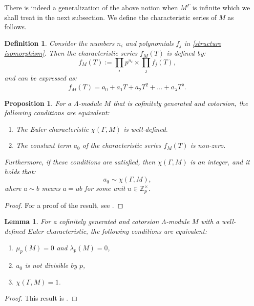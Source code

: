 \documentclass[12pt]{amsart}
\newtheorem{lemma}[theorem]{Lemma}
\newtheorem{definition}[theorem]{Definition}
\newtheorem{proposition}[theorem]{Proposition}
\newcommand{\Z}{\mathbb{Z}}
\numberwithin{equation}{section}
\begin{document}
There is indeed a generalization of the above notion when $M^\Gamma$ is infinite which we shall treat in the next subsection.
We define the characteristic series of $ M $ as follows.

\begin{definition}
Consider the numbers $n_i$ and polynomials $f_j$ in \eqref{structure isomorphism}. Then the characteristic series $ f_M(T) $ is defined by:
    \[
    f_M(T) := \prod_i p^{n_i} \times \prod_j f_j(T),
    \]
    and can be expressed as:
    \[
    f_M(T) = a_0 + a_1 T + a_2 T^2 + \dots + a_\lambda T^\lambda.
    \]
\end{definition}

\begin{proposition}\label{Prop 3.6}
    For a $\Lambda$-module $ M $ that is cofinitely generated and cotorsion, the following conditions are equivalent:
    \begin{enumerate}
        \item The Euler characteristic $\chi(\Gamma, M)$ is well-defined.
        \item The constant term $ a_0 $ of the characteristic series $ f_M(T) $ is non-zero.
    \end{enumerate}
    Furthermore, if these conditions are satisfied, then $\chi(\Gamma, M)$ is an integer, and it holds that:
    \[
    a_0 \sim \chi(\Gamma, M),
    \]
    where $ a \sim b $ means $ a = ub $ for some unit $ u \in \Z_p^\times $.
\end{proposition}

\begin{proof}
   For a proof of the result, see \cite[Proposition 4.4]{ray2024analogue}.
\end{proof}

\begin{lemma}\label{lem:classical-euler-characteristic}
    For a cofinitely generated and cotorsion $\Lambda$-module $ M $ with a well-defined Euler characteristic, the following conditions are equivalent:
    \begin{enumerate}
        \item\label{p1} $\mu_p(M) = 0$ and $\lambda_p(M) = 0$,
        \item\label{p2} $ a_0 $ is not divisible by $ p $,
        \item\label{p3} $\chi(\Gamma, M) = 1$.
    \end{enumerate}
\end{lemma}

\begin{proof}
    This result is \cite[Lemma 4.5]{ray2024analogue}.
\end{proof}
\end{document}

